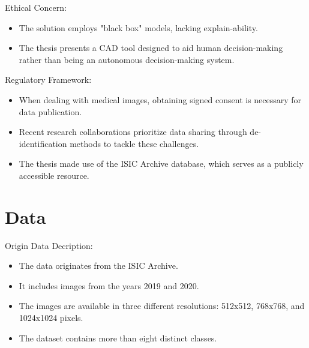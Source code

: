 \documentclass[dvipsnames,mathserif]{beamer}
\begin{document}
{\begin{frame}
    \end{frame}



    \begin{frame}

      \large Ethical Concern:
      \vspace{0.25cm}

      \footnotesize
      \begin{itemize}
        \item The solution employs "black box" models, lacking explain-ability.
        \item The thesis presents a CAD tool designed to aid human decision-making
          rather than being an autonomous decision-making system.
      \end{itemize}

    \end{frame}


    \begin{frame}

      \large Regulatory Framework:
      \vspace{0.25cm}

      \footnotesize

      \begin{itemize}
        \item When dealing with medical images, obtaining signed consent is
          necessary for data publication.
        \item Recent research collaborations prioritize data sharing through
          de-identification methods to tackle these challenges.
        \item The thesis made use of the ISIC Archive database, which serves as
          a publicly accessible resource.
      \end{itemize}


    \end{frame}



    \section{Data}

    \begin{frame}

      \large Origin Data Decription:
      \vspace{0.25cm}

      \footnotesize

      \begin{itemize}
        \item The data originates from the ISIC Archive.
        \item It includes images from the years 2019 and 2020.
        \item The images are available in three different resolutions: 512x512,
          768x768, and 1024x1024 pixels.
        \item The dataset contains more than eight distinct classes.
      \end{itemize}


\end{frame}}
\end{document}
